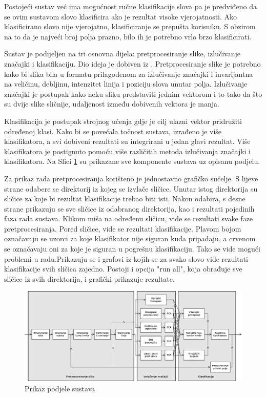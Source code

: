 \documentclass[a4paper,twocolumn,dvipdfm]{article}
\begin{document}
Postojeći sustav već ima mogućnost ručne klasifikacije slova pa je predviđeno
da se ovim sustavom slovo klasificira ako je rezultat visoke vjerojatnosti. Ako
klasificirano slovo nije vjerojatno, klasificiranje se prepušta korisniku. S
obzirom na to da je najveći broj polja prazno, bilo ih je potrebno vrlo brzo
klasificirati.

Sustav je podijeljen na tri osnovna dijela: pretprocesiranje slike, izlučivanje
značajki i klasifikaciju. Dio ideja je dobiven iz \cite{vamvakasoptical}.
Pretprocesiranje slike je potrebno kako bi slika bila u formatu prilagođenom za
izlučivanje značajki i invarijantna na veličinu, debljinu, intenzitet linija i
poziciju slova unutar polja. Izlučivanje značajki je postupak kako neku sliku
predstaviti jednim vektorom i to tako da što su dvije slike sličnije, udaljenost
između dobivenih vektora je manja.

Klasifikacija je postupak strojnog učenja gdje je cilj ulazni vektor pridružiti
određenoj klasi. Kako bi se povećala točnost sustava, izrađeno je više
klasifikatora, a svi dobiveni rezultati su integrirani u jedan glavi rezultat.
Više klasifikatora je postignuto pomoću više različitih metoda izlučivanja
značajki i klasifikatora. Na Slici \ref{figure:cijeliSustav} su prikazane sve
komponente sustava uz opisanu podjelu.

Za prikaz rada pretprocesiranja korišteno je jednostavno grafičko sučelje.
S lijeve strane odabere se direktorij iz kojeg se izvlače sličice. Unutar istog
direktorija su sličice za koje bi rezultat klasifikacije trebao biti isti.
Nakon odabira, s desne strane prikazuju se sve sličice iz odabranog direktorija,
kao i rezultati pojedinih faza rada sustava. Klikom miša na određenu sličicu,
vide se rezultati svake faze pretprocesiranja. Pored sličice, vide se rezultati
klasifikacije. Plavom bojom označavaju se uzorci za koje klasifikator nije
siguran kuda pripadaju, a crvenom se označavaju oni za koje je siguran u
pogrešnu klasifikaciju. Tako se vide mogući problemi u radu.Prikazuju se i
grafovi iz kojih se za svako slovo vide rezultati klasifikacije svih sličica
zajedno. Postoji i opcija "run all", koja obrađuje sve sličice iz svih
direktorija, i grafički prikazuje rezultate.


\begin{figure}
\centering
\includegraphics[width=\textwidth]{Diagram1.eps}
\caption{Prikaz podjele sustava}
\label{figure:cijeliSustav}
\end{figure}
\end{document}
